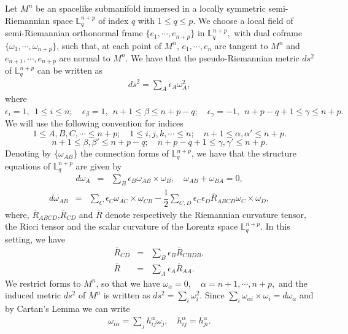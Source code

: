 \documentclass[leqno,11pt]{amsart}
\theoremstyle{plain}
\theoremstyle{definition}
\numberwithin{equation}{section}
\begin{document}
Let $M^n$ be an spacelike submanifold immersed in a locally symmetric semi-Riemannian space $\mathbb{L}_{q}^{n+p}$ of index $q$ with $1\leq q\leq p.$
We choose a local field of semi-Riemannian orthonormal frame $\{e_1,\cdots,e_{n+p}\}$ in $\mathbb{L}_{q}^{n+p},$
with dual coframe $\{\omega_1,\cdots,\omega_{n+p}\}$, such that, at each
point of $M^n$, $e_1,\cdots,e_n$ are tangent to $M^n$ and $e_{n+1},\cdots,e_{n+p}$ are normal to $M^n$. We have
that the pseudo-Riemannian metric $ds^2$ of $\mathbb{L}_{q}^{n+p}$ can be written as
\begin{eqnarray*}
d\overline{s}^2=\sum_{A}\epsilon_{A}\omega_{A}^2,
\end{eqnarray*}
where
$\epsilon_i=1, ~~ 1\leq i\leq n; \quad \epsilon_{\beta} = 1, ~~ n+1\leq \beta\leq n+p-q;\quad \epsilon_{\gamma}=-1, ~~ n+p-q+1\leq\gamma\leq n+p.$
\\
We will use the following convention for indices
$$1\leq A, B, C,\cdots\leq n + p; \quad 1\leq i, j, k,\cdots \leq n; \quad n + 1\leq \alpha, \alpha' \leq n + p.$$
$$n + 1\leq \beta,\beta'\leq n + p-q; \quad  n + p-q+1\leq \gamma,\gamma'\leq n+p.$$
Denoting by $\{\omega_{AB}\}$ the connection forms of $\mathbb{L}_{q}^{n+p}$, we have that the structure equations
of $\mathbb{L}_{q}^{n+p}$ are given by
\begin{eqnarray}
d\omega_{A}&=&\sum_{B}\epsilon_{B}\omega_{AB}\times \omega_{B},\quad \omega_{AB}+\omega_{BA}=0,
\end{eqnarray}
\begin{eqnarray}\label{derivada}
d\omega_{AB}&=&\sum_{C}\epsilon_{C}\omega_{AC}\times \omega_{CB}-\dfrac{1}{2}\sum_{C,D}\epsilon_{C}\epsilon_{D}\overline{R}_{ABCD}\omega_{C}\times \omega_{D},
\end{eqnarray}
where, $\overline{R}_{ABCD}$,$\overline{R}_{CD}$ and $\overline{R}$ denote respectively the Riemannian curvature
tensor, the Ricci tensor and the scalar curvature of the Lorentz space $\mathbb{L}_{q}^{n+p}.$
In this setting, we have
\begin{eqnarray*}
\overline{R}_{CD}&=&\sum_{B}\epsilon_{B}\overline{R}_{CBDB},\\
\overline{R}&=&\sum_{A}\epsilon_{A}\overline{R}_{AA}.
\end{eqnarray*}
We restrict forms to $M^n$, so that we have
$\omega_{\alpha}=0,\quad \alpha=n+1,\cdots, n+p,$
and the induced metric $ds^2$ of $M^n$ is written as $ds^2=\sum_{i}\omega_i^2.$
Since $\sum_{i}\omega_{\alpha i}\times \omega_{i}=d\omega_{\alpha}$ and by Cartan's Lemma we can write 
\begin{eqnarray}\label{COMUTATIVIDADE}
\omega_{i\alpha}=\sum_{j}h_{ij}^{\alpha}\omega_{j},\quad h_{ij}^{\alpha}=h_{ji}^{\alpha}.
\end{eqnarray}
\end{document}
